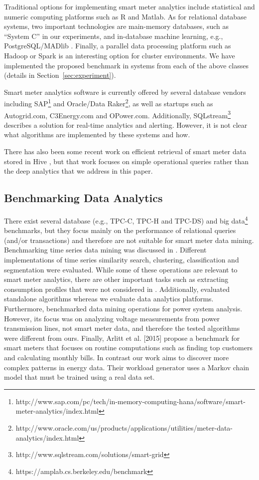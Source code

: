 \documentclass[prodmode,acmtods]{acmsmall}
\begin{document}
Traditional options for implementing smart meter analytics include statistical and numeric computing platforms such as R and Matlab.  As for relational database systems, two important technologies are main-memory databases, such as ``System C'' in our experiments, and in-database machine learning, e.g., PostgreSQL/MADlib \cite{madlibpaper}.  Finally, a parallel data processing platform such as Hadoop or Spark is an interesting option for cluster environments.  We have implemented the proposed benchmark in systems from each of the above classes (details in Section~\ref{sec:experiment}).  

Smart meter analytics software is currently offered by several database vendors including SAP\footnote{http://www.sap.com/pc/tech/in-memory-computing-hana/software/smart-meter-analytics/index.html} and Oracle/Data Raker\footnote{http://www.oracle.com/us/products/applications/utilities/meter-data-analytics/index.html}, as well as startups such as Autogrid.com, C3Energy.com and OPower.com. 
Additionally, SQLstream\footnote{http://www.sqlstream.com/solutions/smart-grid} describes a solution for real-time analytics and alerting.  However, it is not clear what algorithms are implemented by these systems and how.

There has also been some recent work on efficient retrieval of smart meter data stored in Hive \cite{liu14}, but that work focuses on simple operational queries rather than the deep analytics that we address in this paper.

\subsection{Benchmarking Data Analytics}

There exist several database (e.g., TPC-C, TPC-H and TPC-DS) and big data\footnote{https://amplab.cs.berkeley.edu/benchmark} benchmarks, but they focus mainly on the performance of relational queries (and/or transactions) and therefore are not suitable for smart meter data mining.  Benchmarking time series data mining was discussed in \cite{keogh}.  Different implementations of time series similarity search, clustering, classification and segmentation were evaluated.  While some of these operations are relevant to smart meter analytics, there are other important tasks such as extracting consumption profiles that were not considered in \cite{keogh}.  Additionally, \cite{keogh} evaluated standalone algorithms whereas we evaluate data analytics platforms.  Furthermore, \cite{can2013} benchmarked data mining operations for power system analysis.  However, its focus was on analyzing voltage measurements from power transmission lines, not smart meter data, and therefore the tested algorithms were different from ours.  Finally, Arlitt et al. [2015] propose a benchmark for smart meters that focuses on routine computations such as finding top customers and calculating monthly bills.  In contrast our work aims to discover more complex patterns in energy data.  Their workload generator uses a Markov chain model that must be trained using a real data set.
\end{document}
